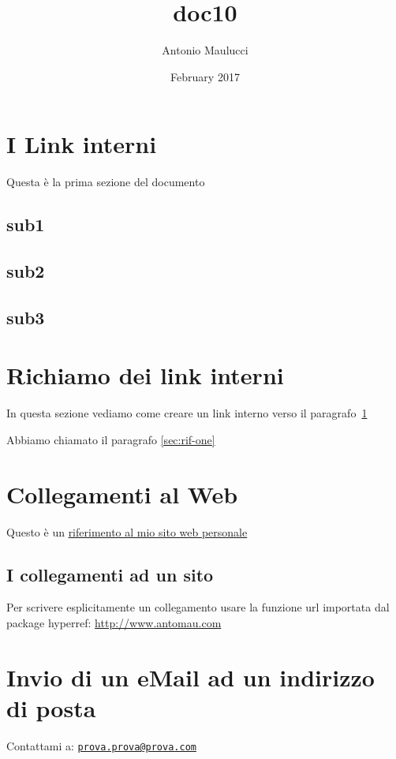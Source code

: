 \documentclass[a4paper]{article}
\title{doc10}
\author{Antonio Maulucci}
\date{February 2017}
\newcommand{\mail}[1]{\href{mailto:#1}{\texttt{#1}}}
\begin{document}
\maketitle

\section{I Link interni}
\label{sec:rif-one} %

Questa è la prima sezione del documento

\subsection{sub1}
\subsection{sub2}
\subsection{sub3}

\newpage

\section{Richiamo dei link interni}

In questa sezione vediamo come creare un link interno verso il paragrafo~\ref{sec:rif-one}

Abbiamo chiamato il paragrafo \vref{sec:rif-one} %


\section{Collegamenti al Web}

Questo è un \href{http://www.antomau.com}{riferimento al mio sito web personale}

\subsection{I collegamenti ad un sito}

Per scrivere esplicitamente un collegamento usare la funzione url importata dal package hyperref: \url{http://www.antomau.com}

\section{Invio di un eMail ad un indirizzo di posta}
Contattami a: \mail{prova.prova@prova.com}
\end{document}

